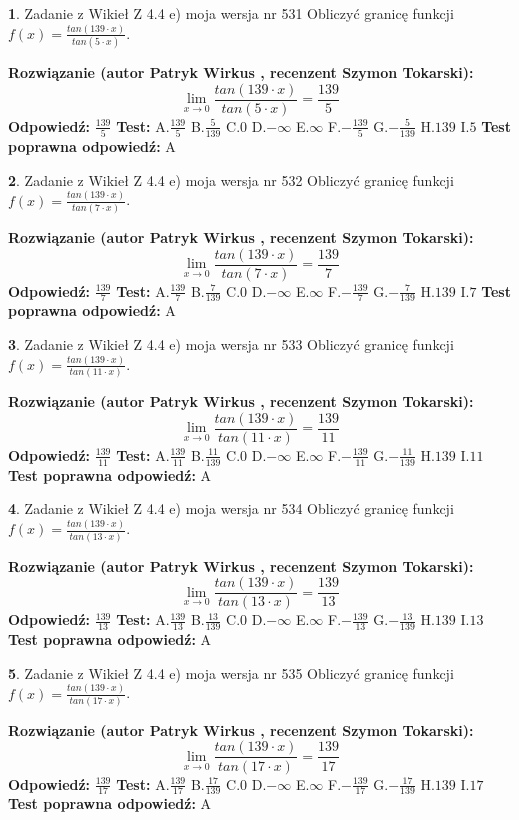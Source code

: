 \documentclass[12pt, a4paper]{article}
\theoremstyle{definition} %
\newtheorem{zad}{}
\newcommand{\zadStart}[1]{\begin{zad}#1\newline}
\newcommand{\zadStop}{\end{zad}}
\newcommand{\rozwStart}[2]{\noindent \textbf{Rozwiązanie (autor #1 , recenzent #2): }\newline}
\newcommand{\rozwStop}{\newline}
\newcommand{\odpStart}{\noindent \textbf{Odpowiedź:}\newline}
\newcommand{\odpStop}{\newline}
\newcommand{\testStart}{\noindent \textbf{Test:}\newline}
\newcommand{\testStop}{\newline}
\newcommand{\kluczStart}{\noindent \textbf{Test poprawna odpowiedź:}\newline}
\newcommand{\kluczStop}{\newline}
\begin{document}
\zadStart{Zadanie z Wikieł Z 4.4 e) moja wersja nr 531}
Obliczyć granicę funkcji $f(x)=\frac{tan(139\cdot x)}{tan(5\cdot x)}$.
\zadStop
\rozwStart{Patryk Wirkus}{Szymon Tokarski}
$$\lim\limits_{x\to 0}\frac{tan(139\cdot x)}{tan(5\cdot x)}=
\frac{139}{5}$$
\rozwStop
\odpStart
$\frac{139}{5}$
\odpStop
\testStart
A.$\frac{139}{5}$
B.$\frac{5}{139}$
C.$0$
D.$-\infty$
E.$\infty$
F.$-\frac{139}{5}$
G.$-\frac{5}{139}$
H.$139$
I.$5$
\testStop
\kluczStart
A
\kluczStop



\zadStart{Zadanie z Wikieł Z 4.4 e) moja wersja nr 532}
Obliczyć granicę funkcji $f(x)=\frac{tan(139\cdot x)}{tan(7\cdot x)}$.
\zadStop
\rozwStart{Patryk Wirkus}{Szymon Tokarski}
$$\lim\limits_{x\to 0}\frac{tan(139\cdot x)}{tan(7\cdot x)}=
\frac{139}{7}$$
\rozwStop
\odpStart
$\frac{139}{7}$
\odpStop
\testStart
A.$\frac{139}{7}$
B.$\frac{7}{139}$
C.$0$
D.$-\infty$
E.$\infty$
F.$-\frac{139}{7}$
G.$-\frac{7}{139}$
H.$139$
I.$7$
\testStop
\kluczStart
A
\kluczStop



\zadStart{Zadanie z Wikieł Z 4.4 e) moja wersja nr 533}
Obliczyć granicę funkcji $f(x)=\frac{tan(139\cdot x)}{tan(11\cdot x)}$.
\zadStop
\rozwStart{Patryk Wirkus}{Szymon Tokarski}
$$\lim\limits_{x\to 0}\frac{tan(139\cdot x)}{tan(11\cdot x)}=
\frac{139}{11}$$
\rozwStop
\odpStart
$\frac{139}{11}$
\odpStop
\testStart
A.$\frac{139}{11}$
B.$\frac{11}{139}$
C.$0$
D.$-\infty$
E.$\infty$
F.$-\frac{139}{11}$
G.$-\frac{11}{139}$
H.$139$
I.$11$
\testStop
\kluczStart
A
\kluczStop



\zadStart{Zadanie z Wikieł Z 4.4 e) moja wersja nr 534}
Obliczyć granicę funkcji $f(x)=\frac{tan(139\cdot x)}{tan(13\cdot x)}$.
\zadStop
\rozwStart{Patryk Wirkus}{Szymon Tokarski}
$$\lim\limits_{x\to 0}\frac{tan(139\cdot x)}{tan(13\cdot x)}=
\frac{139}{13}$$
\rozwStop
\odpStart
$\frac{139}{13}$
\odpStop
\testStart
A.$\frac{139}{13}$
B.$\frac{13}{139}$
C.$0$
D.$-\infty$
E.$\infty$
F.$-\frac{139}{13}$
G.$-\frac{13}{139}$
H.$139$
I.$13$
\testStop
\kluczStart
A
\kluczStop



\zadStart{Zadanie z Wikieł Z 4.4 e) moja wersja nr 535}
Obliczyć granicę funkcji $f(x)=\frac{tan(139\cdot x)}{tan(17\cdot x)}$.
\zadStop
\rozwStart{Patryk Wirkus}{Szymon Tokarski}
$$\lim\limits_{x\to 0}\frac{tan(139\cdot x)}{tan(17\cdot x)}=
\frac{139}{17}$$
\rozwStop
\odpStart
$\frac{139}{17}$
\odpStop
\testStart
A.$\frac{139}{17}$
B.$\frac{17}{139}$
C.$0$
D.$-\infty$
E.$\infty$
F.$-\frac{139}{17}$
G.$-\frac{17}{139}$
H.$139$
I.$17$
\testStop
\kluczStart
A
\kluczStop
\end{document}
